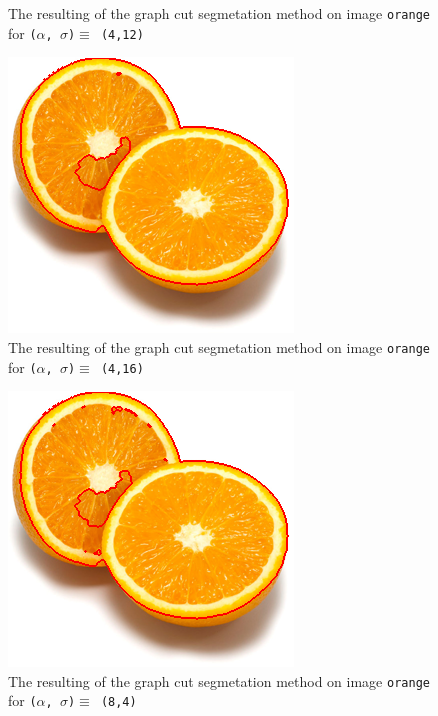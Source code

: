 {\begin{minipage}{0.45\linewidth}
\begin{figure}[H]
      \caption{The resulting of the graph cut segmetation method on image \texttt{orange} for
        \texttt{($\alpha$, $\sigma$)$ \equiv$ (4,12)}}
      \label{fig:04_orange2_a4_s12}
    \end{figure}
  \end{minipage}

  \begin{minipage}{0.45\linewidth}
    \begin{figure}[H]
      \includegraphics[scale=0.5]{./images/04/Q11/var_a_b/orange/graphcut2_a4_s16.png}
      \caption{The resulting of the graph cut segmetation method on image \texttt{orange} for
        \texttt{($\alpha$, $\sigma$)$ \equiv$ (4,16)}}
      \label{fig:04_orange2_a4_s16}
    \end{figure}
    \vfill
    \begin{figure}[H]
      \includegraphics[scale=0.5]{./images/04/Q11/var_a_b/orange/graphcut2_a8_s4.png}
      \caption{The resulting of the graph cut segmetation method on image \texttt{orange} for
        \texttt{($\alpha$, $\sigma$)$ \equiv$ (8,4)}}
      \label{fig:04_orange2_a8_s4}
    \end{figure}

\end{minipage}}
